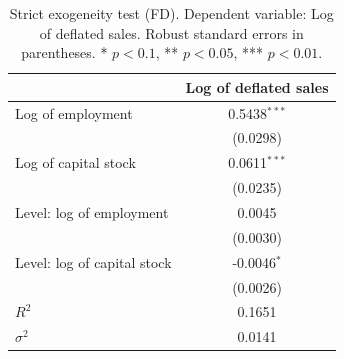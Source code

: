 \begin{table}[!htbp]
\centering
\begin{tabular}{lc}
\toprule
 & Log of deflated sales \\
\midrule
Log of employment & 0.5438$^{***}$ \\
 & (0.0298) \\
\addlinespace
Log of capital stock & 0.0611$^{***}$ \\
 & (0.0235) \\
\addlinespace
Level: log of employment & 0.0045 \\
 & (0.0030) \\
\addlinespace
Level: log of capital stock & -0.0046$^{*}$ \\
 & (0.0026) \\
\midrule
$R^2$ & 0.1651 \\
$\sigma^2$ & 0.0141 \\
\bottomrule
\end{tabular}
\caption{Strict exogeneity test (FD). Dependent variable: Log of deflated sales. Robust standard errors in parentheses. * $p<0.1$, ** $p<0.05$, *** $p<0.01$.}
\label{tab:strict_exogeneity_test_fd}
\end{table}
